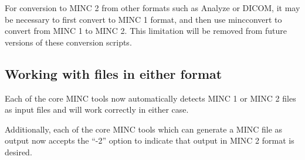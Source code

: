 \documentclass{article}
\begin{document}
For conversion to MINC 2 from other formats such as Analyze or DICOM,
it may be necessary to first convert to MINC 1 format, and then use
mincconvert to convert from MINC 1 to MINC 2.  This limitation will be
removed from future versions of these conversion scripts.

\subsection{Working with files in either format}
Each of the core MINC tools now automatically detects MINC 1 or MINC 2
files as input files and will work correctly in either case.

Additionally, each of the core MINC tools which can generate a MINC file
as output now accepts the ``-2'' option
to indicate that output in MINC 2 format is desired.
\end{document}
